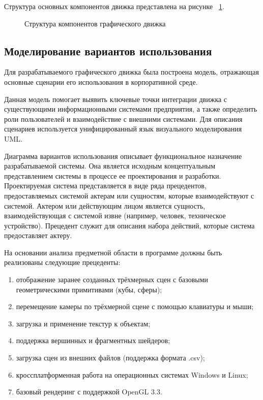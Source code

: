 Структура основных компонентов движка представлена на рисунке ~\ref{templ:image}.

\begin{figure}[ht]
\caption{Структура компонентов графического движка}
\label{templ:image}
\end{figure}

\subsection{Моделирование вариантов использования}

Для разрабатываемого графического движка была построена модель, отражающая основные сценарии его использования в корпоративной среде.

Данная модель помогает выявить ключевые точки интеграции движка с существующими информационными системами предприятия, а также определить роли пользователей и взаимодействие с внешними системами. Для описания сценариев используется унифицированный язык визуального моделирования UML.

Диаграмма вариантов использования описывает функциональное назначение разрабатываемой системы. Она является исходным концептуальным представлением системы в процессе ее проектирования и разработки. Проектируемая система представляется в виде ряда прецедентов, предоставляемых системой актерам или сущностям, которые взаимодействуют с системой. Актером или действующим лицом является сущность, взаимодействующая с системой извне (например, человек, техническое устройство). Прецедент служит для описания набора действий, которые система предоставляет актеру.

На основании анализа предметной области в программе должны быть реализованы следующие прецеденты:
\begin{enumerate}
    \item отображение заранее созданных трёхмерных сцен с базовыми геометрическими примитивами (кубы, сферы);
    \item перемещение камеры по трёхмерной сцене с помощью клавиатуры и мыши;
    \item загрузка и применение текстур к объектам;
    \item поддержка вершинных и фрагментных шейдеров;
    \item загрузка сцен из внешних файлов (поддержка формата .csv);
    \item кроссплатформенная работа на операционных системах Windows и Linux;
    \item базовый рендеринг с поддержкой OpenGL 3.3.
\end{enumerate}

